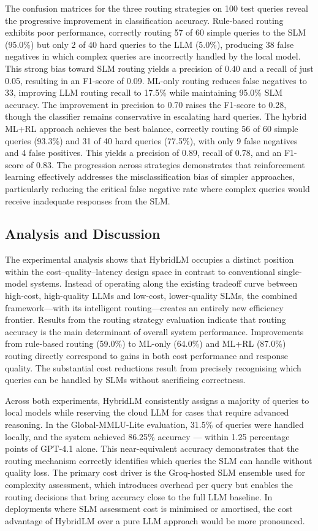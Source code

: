 The confusion matrices for the three routing strategies on 100 test queries reveal the progressive improvement in classification accuracy. Rule-based routing exhibits poor performance, correctly routing 57 of 60 simple queries to the SLM (95.0\%) but only 2 of 40 hard queries to the LLM (5.0\%), producing 38 false negatives in which complex queries are incorrectly handled by the local model. This strong bias toward SLM routing yields a precision of 0.40 and a recall of just 0.05, resulting in an F1-score of 0.09. ML-only routing reduces false negatives to 33, improving LLM routing recall to 17.5\% while maintaining 95.0\% SLM accuracy. The improvement in precision to 0.70 raises the F1-score to 0.28, though the classifier remains conservative in escalating hard queries. The hybrid ML+RL approach achieves the best balance, correctly routing 56 of 60 simple queries (93.3\%) and 31 of 40 hard queries (77.5\%), with only 9 false negatives and 4 false positives. This yields a precision of 0.89, recall of 0.78, and an F1-score of 0.83. The progression across strategies demonstrates that reinforcement learning effectively addresses the misclassification bias of simpler approaches, particularly reducing the critical false negative rate where complex queries would receive inadequate responses from the SLM.

\subsection{Analysis and Discussion}
The experimental analysis shows that HybridLM occupies a distinct position within the cost--quality--latency design space in contrast to conventional single-model systems. Instead of operating along the existing tradeoff curve between high-cost, high-quality LLMs and low-cost, lower-quality SLMs, the combined framework---with its intelligent routing---creates an entirely new efficiency frontier. Results from the routing strategy evaluation indicate that routing accuracy is the main determinant of overall system performance. Improvements from rule-based routing (59.0\%) to ML-only (64.0\%) and ML+RL (87.0\%) routing directly correspond to gains in both cost performance and response quality. The substantial cost reductions result from precisely recognising which queries can be handled by SLMs without sacrificing correctness.

Across both experiments, HybridLM consistently assigns a majority of queries to local models while reserving the cloud LLM for cases that require advanced reasoning. In the Global-MMLU-Lite evaluation, 31.5\% of queries were handled locally, and the system achieved 86.25\% accuracy — within 1.25 percentage points of GPT-4.1 alone. This near-equivalent accuracy demonstrates that the routing mechanism correctly identifies which queries the SLM can handle without quality loss. The primary cost driver is the Groq-hosted SLM ensemble used for complexity assessment, which introduces overhead per query but enables the routing decisions that bring accuracy close to the full LLM baseline. In deployments where SLM assessment cost is minimised or amortised, the cost advantage of HybridLM over a pure LLM approach would be more pronounced.
